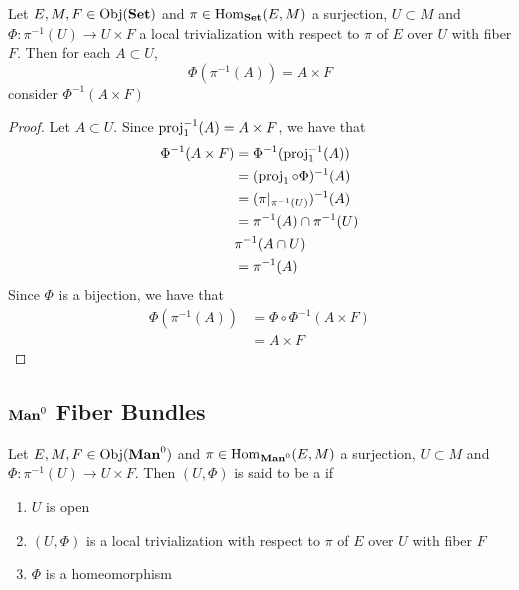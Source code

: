 \documentclass{book}
\begin{document}
	\begin{ex}
		Let $E, M, F \in \operatorname{Obj}(\operatorname*{\text{\textbf{Set}}})$ and $\pi \in \operatorname{Hom}_{\operatorname*{\text{\textbf{Set}}}}(E, M)$ a surjection, $U \subset M$ and $\Phi: \pi^{-1}(U) \rightarrow U \times F$ a local trivialization with respect to $\pi$ of $E$ over $U$ with fiber $F$. Then for each $A \subset U$, $$\Phi( \pi^{-1}(A)) = A \times F$$
		 consider $\Phi^{-1}(A \times F)$ 
	\end{ex}
	
	\begin{proof}
		Let $A \subset U$. Since $\operatorname{\text{proj}}_1^{-1}(A) = A \times F$, we have that 
		\begin{align*}
			\Phi^{-1}(A \times F)
			& = \Phi^{-1}(\operatorname{\text{proj}}_1^{-1}(A)) \\
			& = (\operatorname{\text{proj}}_1 \circ \Phi)^{-1}(A) \\
			& = (\pi|_{\pi^{-1}(U)})^{-1}(A) \\
			& = \pi^{-1}(A) \cap \pi^{-1}(U) \\
			&  \pi^{-1}(A \cap U) \\
			& = \pi^{-1}(A)
		\end{align*}
		Since $\Phi$ is a bijection, we have that
		\begin{align*}
			\Phi (\pi^{-1}(A))
			&= \Phi \circ \Phi^{-1}(A \times F) \\
			&= A \times F
		\end{align*}
	\end{proof}














	
	\subsection{$\Man0$ Fiber Bundles}
	
	\begin{defn}
		Let $E, M, F \in \Obj(\Man0)$ and $\pi \in \Hom_{\Man0}(E, M)$ a surjection, $U \subset M$ and $\Phi: \pi^{-1}(U) \rightarrow U \times F$. Then $(U, \Phi)$ is said to be a   if 
		\begin{enumerate}
			\item $U$ is open
			\item $(U, \Phi)$ is a local trivialization with respect to $\pi$ of $E$ over $U$ with fiber $F$
			\item $\Phi$ is a homeomorphism
		\end{enumerate}
	\end{defn}
\end{document}
